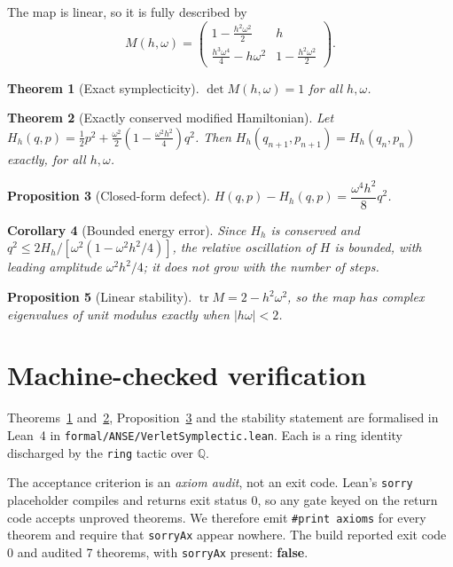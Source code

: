 \documentclass[11pt,a4paper]{article}
\newtheorem{theorem}{Theorem}
\newtheorem{proposition}[theorem]{Proposition}
\newtheorem{corollary}[theorem]{Corollary}
\begin{document}
The map is linear, so it is fully described by
\begin{equation}
  M(h,\omega) =
  \begin{pmatrix}
    1-\frac{h^2\omega^2}{2} & h \\[0.4em]
    \frac{h^3\omega^4}{4}-h\omega^2 & 1-\frac{h^2\omega^2}{2}
  \end{pmatrix} .
\end{equation}

\begin{theorem}[Exact symplecticity]\label{thm:det}
$\det M(h,\omega)=1$ for all $h,\omega$.
\end{theorem}

\begin{theorem}[Exactly conserved modified Hamiltonian]\label{thm:shadow}
Let $H_h(q,p)=\tfrac12p^2+\tfrac{\omega^2}{2}\!\left(1-\tfrac{\omega^2h^2}{4}\right)q^2$.
Then $H_h(q_{n+1},p_{n+1})=H_h(q_n,p_n)$ exactly, for all $h,\omega$.
\end{theorem}

\begin{proposition}[Closed-form defect]\label{prop:gap}
$H(q,p)-H_h(q,p)=\dfrac{\omega^4h^2}{8}q^2$.
\end{proposition}

\begin{corollary}[Bounded energy error]\label{cor:amp}
Since $H_h$ is conserved and $q^2\le 2H_h/\!\left[\omega^2(1-\omega^2h^2/4)\right]$,
the relative oscillation of $H$ is bounded, with leading amplitude
$\omega^2h^2/4$; it does not grow with the number of steps.
\end{corollary}

\begin{proposition}[Linear stability]
$\operatorname{tr} M = 2-h^2\omega^2$, so the map has complex eigenvalues of unit
modulus exactly when $|h\omega|<2$.
\end{proposition}

\section{Machine-checked verification}

Theorems~\ref{thm:det} and~\ref{thm:shadow}, Proposition~\ref{prop:gap} and the
stability statement are formalised in Lean~4 in
\texttt{formal/ANSE/VerletSymplectic.lean}. Each is a ring identity discharged by
the \texttt{ring} tactic over $\mathbb{Q}$.

The acceptance criterion is an \emph{axiom audit}, not an exit code. Lean's
\texttt{sorry} placeholder compiles and returns exit status $0$, so any gate keyed
on the return code accepts unproved theorems. We therefore emit
\texttt{\#print axioms} for every theorem and require that \texttt{sorryAx} appear
nowhere. The build reported exit code 0 and audited
7 theorems, with \texttt{sorryAx} present:
\textbf{false}.
\end{document}
